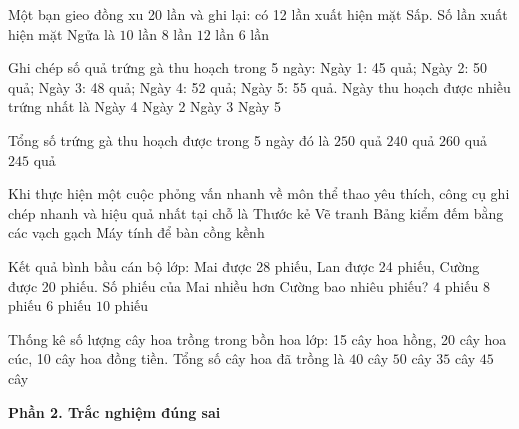 \begin{ex} %
Một bạn gieo đồng xu 20 lần và ghi lại: có 12 lần xuất hiện mặt Sấp. Số lần xuất hiện mặt Ngửa là
\choice
{$10$ lần}
{\True $8$ lần}
{$12$ lần}
{$6$ lần}
\end{ex}

\begin{ex} %
Ghi chép số quả trứng gà thu hoạch trong 5 ngày: Ngày 1: 45 quả; Ngày 2: 50 quả; Ngày 3: 48 quả; Ngày 4: 52 quả; Ngày 5: 55 quả. Ngày thu hoạch được nhiều trứng nhất là
\choice
{Ngày 4}
{Ngày 2}
{Ngày 3}
{\True Ngày 5}
\end{ex}

\begin{ex} %
Tổng số trứng gà thu hoạch được trong 5 ngày đó là
\choice
{\True $250$ quả}
{$240$ quả}
{$260$ quả}
{$245$ quả}
\end{ex}

\begin{ex} %
Khi thực hiện một cuộc phỏng vấn nhanh về môn thể thao yêu thích, công cụ ghi chép nhanh và hiệu quả nhất tại chỗ là
\choice
{Thước kẻ}
{Vẽ tranh}
{\True Bảng kiểm đếm bằng các vạch gạch}
{Máy tính để bàn cồng kềnh}
\end{ex}

\begin{ex} %
Kết quả bình bầu cán bộ lớp: Mai được 28 phiếu, Lan được 24 phiếu, Cường được 20 phiếu. Số phiếu của Mai nhiều hơn Cường bao nhiêu phiếu?
\choice
{$4$ phiếu}
{\True $8$ phiếu}
{$6$ phiếu}
{$10$ phiếu}
\end{ex}

\begin{ex} %
Thống kê số lượng cây hoa trồng trong bồn hoa lớp: 15 cây hoa hồng, 20 cây hoa cúc, 10 cây hoa đồng tiền. Tổng số cây hoa đã trồng là
\choice
{$40$ cây}
{$50$ cây}
{$35$ cây}
{\True $45$ cây}
\end{ex}

\textbf{Phần 2. Trắc nghiệm đúng sai}

